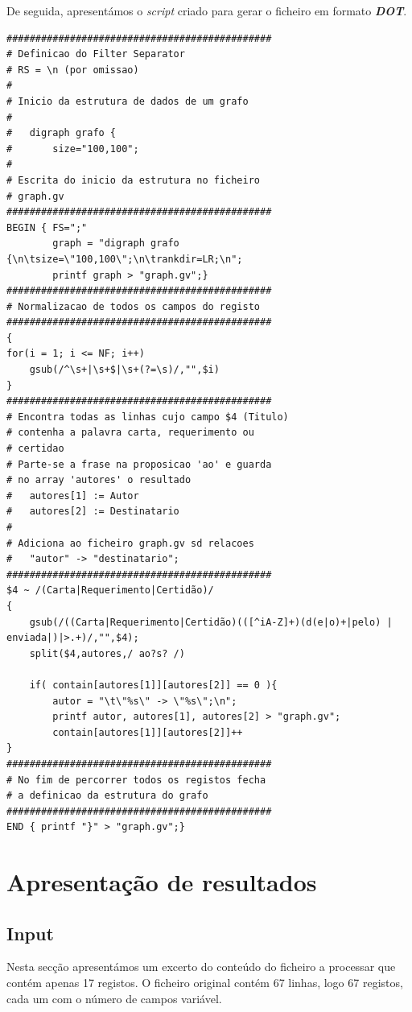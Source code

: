 \documentclass[11pt,a4paper]{report}
\begin{document}
\quad De seguida, apresentámos o \textit{script} criado para gerar o ficheiro em formato \textbf{\textit{DOT}}.
\newpage 
\small{
\begin{verbatim}
##############################################
# Definicao do Filter Separator
# RS = \n (por omissao)
#
# Inicio da estrutura de dados de um grafo
#
#	digraph grafo {
#		size="100,100";
#
# Escrita do inicio da estrutura no ficheiro
# graph.gv
##############################################
BEGIN { FS=";"
        graph = "digraph grafo {\n\tsize=\"100,100\";\n\trankdir=LR;\n";
        printf graph > "graph.gv";}
##############################################
# Normalizacao de todos os campos do registo
##############################################
{ 	
for(i = 1; i <= NF; i++) 
    gsub(/^\s+|\s+$|\s+(?=\s)/,"",$i)
}
##############################################
# Encontra todas as linhas cujo campo $4 (Titulo)  
# contenha a palavra carta, requerimento ou 
# certidao 
# Parte-se a frase na proposicao 'ao' e guarda
# no array 'autores' o resultado
#   autores[1] := Autor
#   autores[2] := Destinatario
#
# Adiciona ao ficheiro graph.gv sd relacoes
#	"autor" -> "destinatario";
##############################################
$4 ~ /(Carta|Requerimento|Certidão)/ 
{	
    gsub(/((Carta|Requerimento|Certidão)(([^iA-Z]+)(d(e|o)+|pelo) | enviada|)|>.+)/,"",$4);
    split($4,autores,/ ao?s? /)
					
    if( contain[autores[1]][autores[2]] == 0 ){
        autor = "\t\"%s\" -> \"%s\";\n";
        printf autor, autores[1], autores[2] > "graph.gv";
        contain[autores[1]][autores[2]]++
}
##############################################
# No fim de percorrer todos os registos fecha
# a definicao da estrutura do grafo
##############################################
END { printf "}" > "graph.gv";}
\end{verbatim}}

\chapter{Apresentação de resultados}
\section{Input}

\qquad Nesta secção apresentámos um excerto do conteúdo do ficheiro a processar que contém apenas 17 registos. O ficheiro original contém 67 linhas, logo 67 registos, cada um com o número de campos variável.
\end{document}
